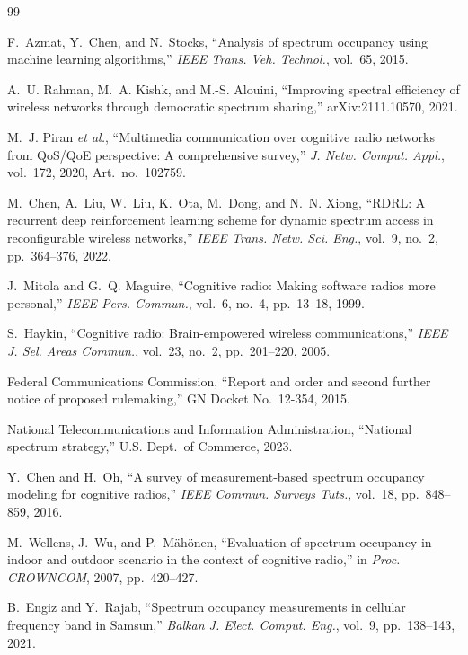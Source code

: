\documentclass[lettersize,journal]{IEEEtran}
\begin{document}
\begin{thebibliography}{99}
\footnotesize

 F.~Azmat, Y.~Chen, and N.~Stocks, ``Analysis of spectrum occupancy using machine learning algorithms,'' \emph{IEEE Trans. Veh. Technol.}, vol.~65, 2015.

 A.~U. Rahman, M.~A. Kishk, and M.-S. Alouini, ``Improving spectral efficiency of wireless networks through democratic spectrum sharing,'' arXiv:2111.10570, 2021.

 M.~J. Piran \emph{et al.}, ``Multimedia communication over cognitive radio networks from QoS/QoE perspective: A comprehensive survey,'' \emph{J. Netw. Comput. Appl.}, vol.~172, 2020, Art.\ no.\ 102759.

 M.~Chen, A.~Liu, W.~Liu, K.~Ota, M.~Dong, and N.~N. Xiong, ``RDRL: A recurrent deep reinforcement learning scheme for dynamic spectrum access in reconfigurable wireless networks,'' \emph{IEEE Trans. Netw. Sci. Eng.}, vol.~9, no.~2, pp.~364--376, 2022.

 J.~Mitola and G.~Q. Maguire, ``Cognitive radio: Making software radios more personal,'' \emph{IEEE Pers. Commun.}, vol.~6, no.~4, pp.~13--18, 1999.

 S.~Haykin, ``Cognitive radio: Brain-empowered wireless communications,'' \emph{IEEE J. Sel. Areas Commun.}, vol.~23, no.~2, pp.~201--220, 2005.

 Federal Communications Commission, ``Report and order and second further notice of proposed rulemaking,'' GN Docket No.~12-354, 2015. %

 National Telecommunications and Information Administration, ``National spectrum strategy,'' U.S. Dept.\ of Commerce, 2023. %

 Y.~Chen and H.~Oh, ``A survey of measurement-based spectrum occupancy modeling for cognitive radios,'' \emph{IEEE Commun. Surveys Tuts.}, vol.~18, pp.~848--859, 2016.

 M.~Wellens, J.~Wu, and P.~M\"ah\"onen, ``Evaluation of spectrum occupancy in indoor and outdoor scenario in the context of cognitive radio,'' in \emph{Proc. CROWNCOM}, 2007, pp.~420--427.

 B.~Engiz and Y.~Rajab, ``Spectrum occupancy measurements in cellular frequency band in Samsun,'' \emph{Balkan J. Elect. Comput. Eng.}, vol.~9, pp.~138--143, 2021.


\end{thebibliography}
\end{document}
